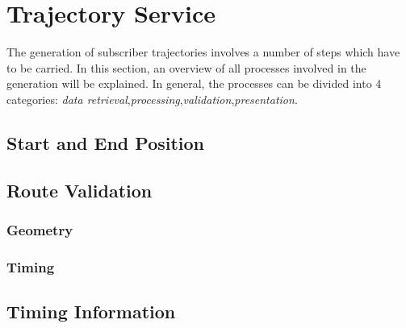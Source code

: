 \documentclass[master,english]{hgbthesis}
\begin{document}











\section{Trajectory Service}

The generation of subscriber trajectories involves a number of steps which have to be carried. In this section, an overview of all processes involved in the generation will be explained. In general, the processes can be divided into 4 categories: \emph{data retrieval},\emph{processing},\emph{validation},\emph{presentation}.

\subsection{Start and End Position}

\subsection{Route Validation}

\subsubsection{Geometry}

\subsubsection{Timing}

\subsection{Timing Information}
\end{document}
